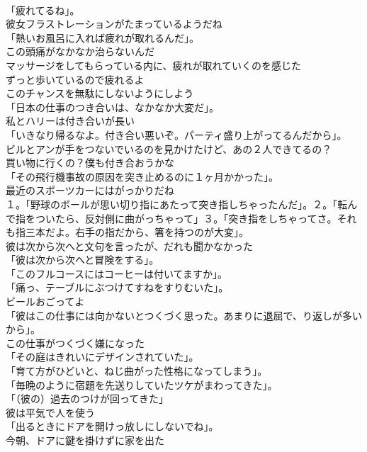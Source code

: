 \documentclass[8pt]{extreport}
\begin{document}
\begin{CJK}{UTF8}{min}
\\	「疲れてるね」。	
\\	彼女フラストレーションがたまっているようだね	
\\	「熱いお風呂に入れば疲れが取れるんだ」。	
\\	この頭痛がなかなか治らないんだ	
\\	マッサージをしてもらっている内に、疲れが取れていくのを感じた	
\\	ずっと歩いているので疲れるよ	
\\	このチャンスを無駄にしないようにしよう	
\\	「日本の仕事のつき合いは、なかなか大変だ」。	
\\	私とハリーは付き合いが長い	
\\	「いきなり帰るなよ。付き合い悪いぞ。パーティ盛り上がってるんだから」。	
\\	ビルとアンが手をつないでいるのを見かけたけど、あの２人できてるの？	
\\	買い物に行くの？僕も付き合おうかな	
\\	「その飛行機事故の原因を突き止めるのに１ヶ月かかった」。	
\\	最近のスポーツカーにはがっかりだね	
\\	１。「野球のボールが思い切り指にあたって突き指しちゃったんだ」。２。「転んで指をついたら、反対側に曲がっちゃって」３。「突き指をしちゃってさ。それも指三本だよ。右手の指だから、箸を持つのが大変」。	
\\	彼は次から次へと文句を言ったが、だれも聞かなかった	
\\	「彼は次から次へと冒険をする」。	
\\	「このフルコースにはコーヒーは付いてますか」。	
\\	「痛っ、テーブルにぶつけてすねをすりむいた」。	
\\	ビールおごってよ	
\\	「彼はこの仕事には向かないとつくづく思った。あまりに退屈で、り返しが多いから」。	
\\	この仕事がつくづく嫌になった	
\\	「その庭はきれいにデザインされていた」。	
\\	「育て方がひどいと、ねじ曲がった性格になってしまう」。	
\\	「毎晩のように宿題を先送りしていたツケがまわってきた」。	
\\	「（彼の）過去のつけが回ってきた」	
\\	彼は平気で人を使う	
\\	「出るときにドアを開けっ放しにしないでね」。	
\\	今朝、ドアに鍵を掛けずに家を出た	

\end{CJK}
\end{document}
